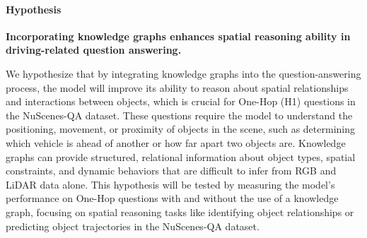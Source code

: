 \documentclass{article} %
\begin{document}
	
	
	\paragraph{Hypothesis}
	\textbf{Incorporating knowledge graphs enhances spatial reasoning ability in driving-related question answering.}
	
	We hypothesize that by integrating knowledge graphs into the question-answering process, the model will improve its ability to reason about spatial relationships and interactions between objects, which is crucial for One-Hop (H1) questions in the NuScenes-QA dataset. These questions require the model to understand the positioning, movement, or proximity of objects in the scene, such as determining which vehicle is ahead of another or how far apart two objects are. Knowledge graphs can provide structured, relational information about object types, spatial constraints, and dynamic behaviors that are difficult to infer from RGB and LiDAR data alone. This hypothesis will be tested by measuring the model’s performance on One-Hop questions with and without the use of a knowledge graph, focusing on spatial reasoning tasks like identifying object relationships or predicting object trajectories in the NuScenes-QA dataset.
	
\end{document}

